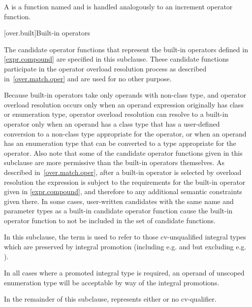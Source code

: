\pnum
{}%
A 
is a function named 
and is handled analogously to an increment operator function.

[over.built]{Built-in operators}%

\pnum
The candidate operator functions that represent the built-in operators
defined in \ref{expr.compound} are specified in this subclause.
These candidate
functions participate in the operator overload resolution process as
described in~\ref{over.match.oper} and are used for no other purpose.
\begin{note}
Because built-in operators take only operands with non-class type,
and operator overload resolution occurs only when an operand expression
originally has class or enumeration type,
operator overload resolution can resolve to a built-in operator only
when an operand has a class type that has a user-defined conversion to
a non-class type appropriate for the operator, or when an operand has
an enumeration type that can be converted to a type appropriate
for the operator.
Also note that some of the candidate operator functions given in this subclause are
more permissive than the built-in operators themselves.
As
described in~\ref{over.match.oper}, after a built-in operator is selected
by overload resolution the expression is subject to the requirements for
the built-in operator given in \ref{expr.compound}, and therefore to any
additional semantic constraints given there.
In some cases, user-written candidates
with the same name and parameter types as a built-in
candidate operator function cause the built-in operator function
to not be included in the set of candidate functions.
\end{note}

\pnum
{}%
%
In this subclause, the term
is used to refer to those cv-unqualified integral types which are preserved by
integral promotion (including e.g.
and
but excluding e.g.
).
\begin{note}
In all cases where a promoted integral type is
required, an operand of unscoped enumeration type will be acceptable by way of the
integral promotions.
\end{note}

\pnum
In the remainder of this subclause,  represents either
 or no cv-qualifier.

